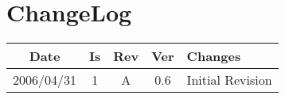 \section{ChangeLog}\label{sec:changelog}

\begin{tabular}{|ccc|c|l|}\hline
\bf{Date} & \bf{Is} & \bf{Rev} & \bf{Ver} & \bf{Changes}\\ \hline

2006/04/31 & 1 & A & 0.6 & Initial Revision \\ \hline


\end{tabular}
